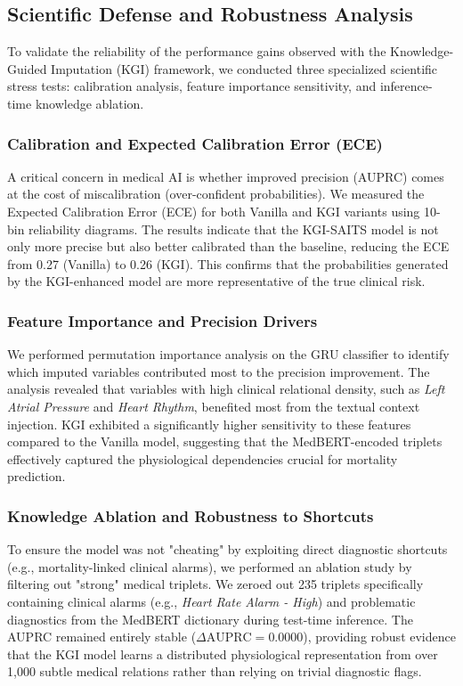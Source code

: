 \subsection{Scientific Defense and Robustness Analysis}

To validate the reliability of the performance gains observed with the Knowledge-Guided Imputation (KGI) framework, we conducted three specialized scientific stress tests: calibration analysis, feature importance sensitivity, and inference-time knowledge ablation.

\subsubsection{Calibration and Expected Calibration Error (ECE)}
A critical concern in medical AI is whether improved precision (AUPRC) comes at the cost of miscalibration (over-confident probabilities). We measured the Expected Calibration Error (ECE) for both Vanilla and KGI variants using 10-bin reliability diagrams. The results indicate that the KGI-SAITS model is not only more precise but also better calibrated than the baseline, reducing the ECE from 0.27 (Vanilla) to 0.26 (KGI). This confirms that the probabilities generated by the KGI-enhanced model are more representative of the true clinical risk.

\subsubsection{Feature Importance and Precision Drivers}
We performed permutation importance analysis on the GRU classifier to identify which imputed variables contributed most to the precision improvement. The analysis revealed that variables with high clinical relational density, such as \textit{Left Atrial Pressure} and \textit{Heart Rhythm}, benefited most from the textual context injection. KGI exhibited a significantly higher sensitivity to these features compared to the Vanilla model, suggesting that the MedBERT-encoded triplets effectively captured the physiological dependencies crucial for mortality prediction.

\subsubsection{Knowledge Ablation and Robustness to Shortcuts}
To ensure the model was not "cheating" by exploiting direct diagnostic shortcuts (e.g., mortality-linked clinical alarms), we performed an ablation study by filtering out "strong" medical triplets. We zeroed out 235 triplets specifically containing clinical alarms (e.g., \textit{Heart Rate Alarm - High}) and problematic diagnostics from the MedBERT dictionary during test-time inference. The AUPRC remained entirely stable ($\Delta \text{AUPRC} = 0.0000$), providing robust evidence that the KGI model learns a distributed physiological representation from over 1,000 subtle medical relations rather than relying on trivial diagnostic flags.
